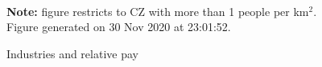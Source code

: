 \begin{figure}[!h]
\centering
\caption{Industries and relative pay}
\label{fig:which_pay}
  \\ 
\par \begin{minipage}[h]{\textwidth}{\tiny\textbf{Note:} figure restricts to CZ with more than 1 people per km$^2$. Figure generated on 30 Nov 2020 at 23:01:52.}\end{minipage}
\end{figure}
